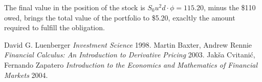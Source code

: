 \documentclass{article}
\begin{document}
The final value in the position of the stock is $S_0 u ^ 2 d \cdot \phi = 115.20$, minus the \$110 owed, brings the total value of the portfolio to \$5.20, exacltly the amount required to fulfill the obligation.

\newpage
\begin{thebibliography}{1}

   David G. Luenberger {\em Investment Science}  1998.
   Martin Baxter, Andrew Rennie {\em Financial Calculus: An Introduction to Derivative Pricing} 2003.
   Jakša Cvitanić, Fernando Zapatero {\em Introduction to the Economics and Mathematics of Financial Markets} 2004.

\end{thebibliography}
\end{document}

